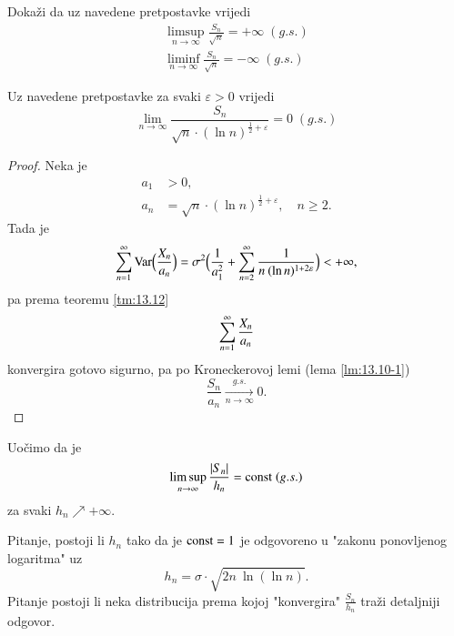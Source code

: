 %
%

\begin{zad} \label{zad:14.10}
    Doka\v zi da uz navedene pretpostavke vrijedi
    \begin{equation*}
        \begin{gathered}
            \limsup\limits_{n \to \infty} \frac{S_n}{\sqrt{n}} = +\infty \; (g.s.)\\
            \liminf\limits_{n \to \infty} \frac{S_n}{\sqrt{n}} = -\infty \; (g.s.)
        \end{gathered}
    \end{equation*}
\end{zad}

\begin{prop}    \label{prop:14.11}
    Uz navedene pretpostavke za svaki $\varepsilon > 0$ vrijedi
    \begin{equation*}
        \lim\limits_{n \to \infty} \frac{S_n}{\sqrt{n} \cdot (\ln n)^{\frac{1}{2} + \varepsilon}} = 0 \; (g.s.)
    \end{equation*}
\end{prop}

\begin{proof}
    Neka je
    \begin{equation*}
        \begin{aligned}
            a_1 &> 0,\\
            a_n &= \sqrt{n} \cdot (\ln n)^{\frac{1}{2} + \varepsilon}, \quad n \geq 2.
        \end{aligned}
    \end{equation*}
    Tada je
    \begin{equation*}
        \sum\limits_{n = 1}^{\infty} \mathrm{Var} \Big( \frac{X_n}{a_n} \Big) = \sigma^2 \Big( \frac{1}{a_1^2} + \sum\limits_{n = 2}^{\infty} \frac{1}{n \: (\ln n)^{1 + 2 \varepsilon}} \Big) < +\infty,
    \end{equation*}
    pa prema teoremu \ref{tm:13.12}
    \begin{equation*}
        \sum\limits_{n = 1}^{\infty} \frac{X_n}{a_n}
    \end{equation*}
    konvergira gotovo sigurno, pa po Kroneckerovoj lemi (lema \ref{lm:13.10-1})
    \begin{equation*}
        \frac{S_n}{a_n} \xrightarrow[n \to \infty]{g.s.} 0.
    \end{equation*}
\end{proof}

Uo\v cimo da je
\begin{equation*}
    \limsup\limits_{n \to \infty} \frac{|S_n|}{h_n} = \mathrm{const} \; (g.s.)
\end{equation*}
za svaki $h_n \nearrow +\infty$.

Pitanje, postoji li $h_n$ tako da je $\mathrm{const} = 1$ je odgovoreno u "zakonu ponovljenog logaritma" uz
\begin{equation*}
    h_n = \sigma \cdot \sqrt{2n \: \ln (\ln n)}.
\end{equation*}
Pitanje postoji li neka distribucija prema kojoj "konvergira" $\frac{S_n}{h_n}$ tra\v zi detaljniji odgovor.